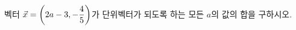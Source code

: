 벡터 $\vec{x}=\left(2a-3{,}\mkern3mu\mathopen{}-\dfrac{4}{5}\right)$가 단위벡터가 되도록 하는 모든 $a$의 값의 합을 구하시오.
